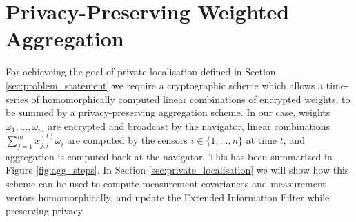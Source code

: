 \documentclass[twocolumn]{autart}    %
\begin{document}
\section{Privacy-Preserving Weighted Aggregation}
For achieveing the goal of private localisation defined in Section \ref{sec:problem_statement} we require a cryptographic scheme which allows a time-series of homomorphically computed linear combinations of encrypted weights, to be summed by a privacy-preserving aggregation scheme. In our case, weights $\omega_1, \dots , \omega_m$ are encrypted and broadcast by the navigator, linear combinations $\sum^m_{j=1}x_{j,i}^{(t)}\omega_i$ are computed by the sensors $i \in \{1, \dots ,n\}$ at time $t$, and aggregation is computed back at the navigator. This has been summarized in Figure \ref{fig:agg_steps}. In Section \ref{sec:private_localisation} we will show how this scheme can be used to compute measurement covariances and measurement vectors homomorphically, and update the Extended Information Filter while preserving privacy. 
\end{document}
